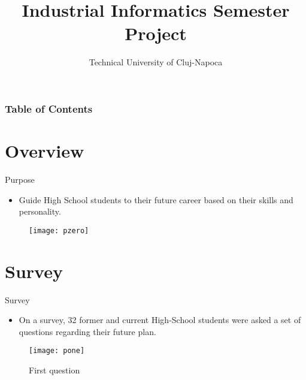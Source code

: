 \documentclass{beamer}
\title{Industrial Informatics Semester Project}
\subtitle{Technical University of Cluj-Napoca}
\author[Technical University of Cluj-Napoca]{%
	\texorpdfstring{%
		\begin{columns}
			\column{.5\linewidth}
			\centering
			Achim Daniel \\ Băltărețu Teodor-Stelian \\ Bugnariu Vlad \\ Ciobotaru Alexandru
			\column{.5\linewidth}
			\centering
			Cuc Diana-Maria \\ Fildan Claudiu \\ Furdui Vasile Teodor \\ Gog Ionela-Maria
		\end{columns}
	}
	{Author 1, Author 2, Author 3}
}
\begin{document}
	\maketitle
	
    \begin{frame}
    	\frametitle{Table of Contents}
    	\tableofcontents
    \end{frame}	



\section{Overview} %

\begin{frame}{Purpose}
	
	\begin{itemize}
		\item Guide High School students to their future career based on their skills and personality.
	\end{itemize}


	\begin{figure}[t]
		\texttt{[image: pzero]}
		\centering
	\end{figure}
\end{frame}



\section{Survey}



\begin{frame}{Survey}
	
	\begin{itemize}
		\item On a survey, 32 former and current High-School students were asked a set of questions regarding their future plan.
	\end{itemize}
	
	\begin{figure}[t]
		\texttt{[image: pone]}
		\centering
		\caption{First question}
	\end{figure}
\end{frame}
\end{document}
